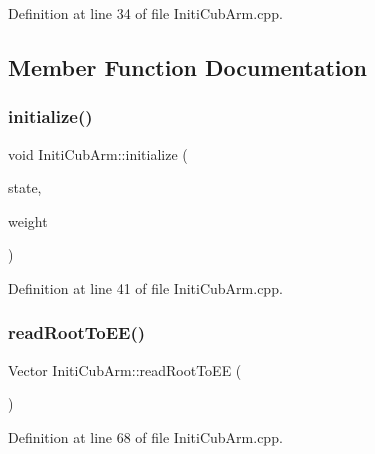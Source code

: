 Definition at line 34 of file Initi\+Cub\+Arm.\+cpp.



\subsection{Member Function Documentation}
\mbox{\label{classInitiCubArm_a6f28c13828b5b90366b1105aef5820e3}} 
\subsubsection{\texorpdfstring{initialize()}{initialize()}}
{\footnotesize\ttfamily void Initi\+Cub\+Arm\+::initialize (\begin{DoxyParamCaption}\item[{Eigen\+::\+Ref$<$ Eigen\+::\+Matrix\+Xf $>$}]{state,  }\item[{Eigen\+::\+Ref$<$ Eigen\+::\+Vector\+Xf $>$}]{weight }\end{DoxyParamCaption})\hspace{0.3cm}{\ttfamily [override]}}



Definition at line 41 of file Initi\+Cub\+Arm.\+cpp.

\mbox{\label{classInitiCubArm_a1dc997322826f47da11f6c247f86e063}} 
\subsubsection{\texorpdfstring{read\+Root\+To\+E\+E()}{readRootToEE()}}
{\footnotesize\ttfamily Vector Initi\+Cub\+Arm\+::read\+Root\+To\+EE (\begin{DoxyParamCaption}{ }\end{DoxyParamCaption})\hspace{0.3cm}{\ttfamily [private]}}



Definition at line 68 of file Initi\+Cub\+Arm.\+cpp.

\mbox{\label{classInitiCubArm_a9e4667c1412ed80a44307fad5e553598}} 

